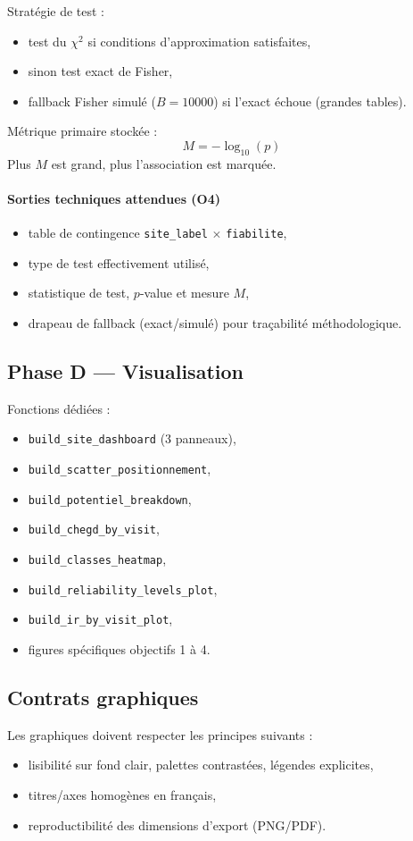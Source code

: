 \documentclass[11pt,a4paper]{article}
\begin{document}
Strat\'egie de test :
\begin{itemize}[leftmargin=1.2cm]
  \item test du $\chi^2$ si conditions d'approximation satisfaites,
  \item sinon test exact de Fisher,
  \item fallback Fisher simul\'e ($B=10000$) si l'exact \'echoue (grandes tables).
\end{itemize}

M\'etrique primaire stock\'ee :
\[
M=-\log_{10}(p)
\]
Plus $M$ est grand, plus l'association est marqu\'ee.

\paragraph{Sorties techniques attendues (O4)}
\begin{itemize}[leftmargin=1.2cm]
  \item table de contingence \texttt{site\_label} $\times$ \texttt{fiabilite},
  \item type de test effectivement utilis\'e,
  \item statistique de test, $p$-value et mesure $M$,
  \item drapeau de fallback (exact/simul\'e) pour traçabilit\'e m\'ethodologique.
\end{itemize}

\subsection{Phase D --- Visualisation}
Fonctions d\'edi\'ees :
\begin{itemize}[leftmargin=1.2cm]
  \item \texttt{build\_site\_dashboard} (3 panneaux),
  \item \texttt{build\_scatter\_positionnement},
  \item \texttt{build\_potentiel\_breakdown},
  \item \texttt{build\_chegd\_by\_visit},
  \item \texttt{build\_classes\_heatmap},
  \item \texttt{build\_reliability\_levels\_plot},
  \item \texttt{build\_ir\_by\_visit\_plot},
  \item figures sp\'ecifiques objectifs 1 à 4.
\end{itemize}

\subsection{Contrats graphiques}
Les graphiques doivent respecter les principes suivants :
\begin{itemize}[leftmargin=1.2cm]
  \item lisibilit\'e sur fond clair, palettes contrast\'ees, l\'egendes explicites,
  \item titres/axes homogènes en français,
  \item reproductibilit\'e des dimensions d'export (PNG/PDF).
\end{itemize}
\end{document}
